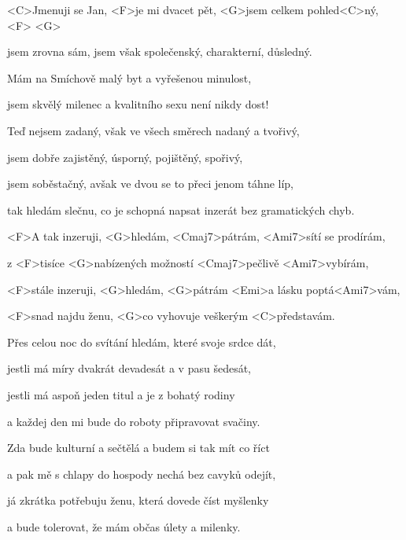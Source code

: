 

\zs
<C>Jmenuji se Jan, <F>je mi dvacet pět, <G>jsem celkem pohled<C>ný, <F> <G>

jsem zrovna sám, jsem však společenský, charakterní, důsledný.

Mám na Smíchově malý byt a vyřešenou minulost,

jsem skvělý milenec a kvalitního sexu není nikdy dost!
\ks

 
\zs
Teď nejsem zadaný, však ve všech směrech nadaný a tvořivý,

jsem dobře zajistěný, úsporný, pojištěný, spořivý,

jsem soběstačný, avšak ve dvou se to přeci jenom táhne líp,

tak hledám slečnu, co je schopná napsat inzerát bez gramatických chyb.
\ks
 
\zr
<F>A tak inzeruji, <G>hledám, <Cmaj7>pátrám, <Ami7>sítí se prodírám,

z <F>tisíce <G>nabízených možností <Cmaj7>pečlivě <Ami7>vybírám,

<F>stále inzeruji, <G>hledám, <G>pátrám <Emi>a lásku poptá<Ami7>vám,

<F>snad najdu ženu, <G>co vyhovuje veškerým <C>představám.
\kr
 
\zs
Přes celou noc do svítání hledám, které svoje srdce dát,

jestli má míry dvakrát devadesát a v pasu šedesát,

jestli má aspoň jeden titul a je z bohatý rodiny

a každej den mi bude do roboty připravovat svačiny.
\ks
 
\zs
Zda bude kulturní a sečtělá a budem si tak mít co říct

a pak mě s chlapy do hospody nechá bez cavyků odejít,

já zkrátka potřebuju ženu, která dovede číst myšlenky

a bude tolerovat, že mám občas úlety a milenky.
\ks

\zr
\kr

\kp
